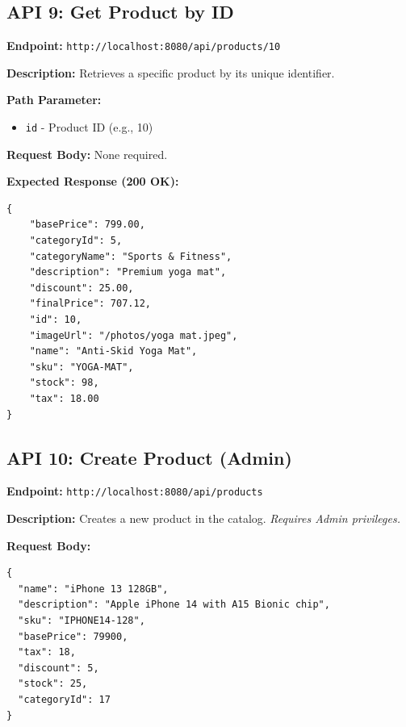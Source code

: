 \documentclass[12pt, a4paper]{article}
\begin{document}
\vspace{0.5cm}

\subsection{API 9: Get Product by ID}

\begin{tcolorbox}[colback=getcolor!10, colframe=getcolor, title=GET]
\textbf{Endpoint:} \texttt{http://localhost:8080/api/products/10}
\end{tcolorbox}

\textbf{Description:} Retrieves a specific product by its unique identifier.

\textbf{Path Parameter:}
\begin{itemize}
    \item \texttt{id} - Product ID (e.g., 10)
\end{itemize}

\textbf{Request Body:} None required.

\textbf{Expected Response (200 OK):}
\begin{lstlisting}
{
    "basePrice": 799.00,
    "categoryId": 5,
    "categoryName": "Sports & Fitness",
    "description": "Premium yoga mat",
    "discount": 25.00,
    "finalPrice": 707.12,
    "id": 10,
    "imageUrl": "/photos/yoga mat.jpeg",
    "name": "Anti-Skid Yoga Mat",
    "sku": "YOGA-MAT",
    "stock": 98,
    "tax": 18.00
}
\end{lstlisting}

\vspace{0.5cm}

\subsection{API 10: Create Product (Admin)}

\begin{tcolorbox}[colback=postcolor!10, colframe=postcolor, title=POST]
\textbf{Endpoint:} \texttt{http://localhost:8080/api/products}
\end{tcolorbox}

\textbf{Description:} Creates a new product in the catalog. \textit{Requires Admin privileges.}

\textbf{Request Body:}
\begin{lstlisting}
{
  "name": "iPhone 13 128GB",
  "description": "Apple iPhone 14 with A15 Bionic chip",
  "sku": "IPHONE14-128",
  "basePrice": 79900,
  "tax": 18,
  "discount": 5,
  "stock": 25,
  "categoryId": 17
}
\end{lstlisting}
\end{document}
